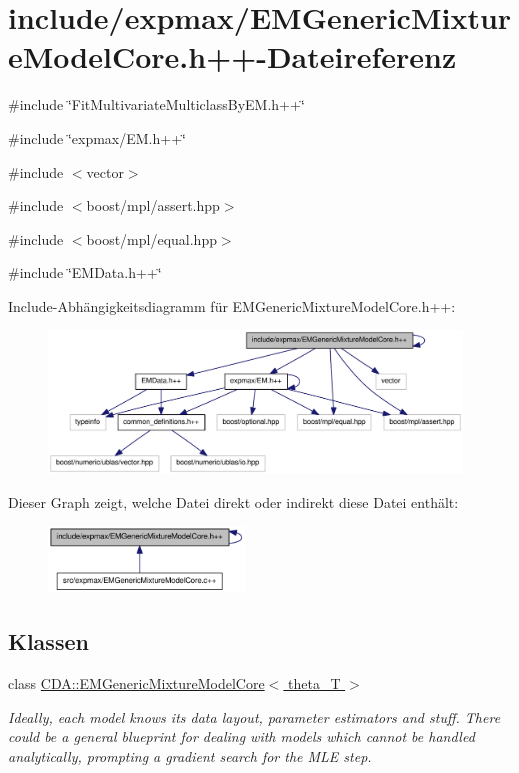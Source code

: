 \hypertarget{EMGenericMixtureModelCore_8h_09_09}{
\section{include/expmax/EMGenericMixtureModelCore.h++-\/Dateireferenz}
\label{EMGenericMixtureModelCore_8h_09_09}
}
{\ttfamily \#include \char`\"{}FitMultivariateMulticlassByEM.h++\char`\"{}}\par
{\ttfamily \#include \char`\"{}expmax/EM.h++\char`\"{}}\par
{\ttfamily \#include $<$vector$>$}\par
{\ttfamily \#include $<$boost/mpl/assert.hpp$>$}\par
{\ttfamily \#include $<$boost/mpl/equal.hpp$>$}\par
{\ttfamily \#include \char`\"{}EMData.h++\char`\"{}}\par
Include-\/Abhängigkeitsdiagramm für EMGenericMixtureModelCore.h++:\nopagebreak
\begin{figure}[H]
\begin{center}
\leavevmode
\includegraphics[width=311pt]{EMGenericMixtureModelCore_8h_09_09__incl}
\end{center}
\end{figure}
Dieser Graph zeigt, welche Datei direkt oder indirekt diese Datei enthält:\nopagebreak
\begin{figure}[H]
\begin{center}
\leavevmode
\includegraphics[width=148pt]{EMGenericMixtureModelCore_8h_09_09__dep__incl}
\end{center}
\end{figure}
\subsection*{Klassen}
\begin{DoxyCompactItemize}
\item 
class \hyperlink{classCDA_1_1EMGenericMixtureModelCore}{CDA::EMGenericMixtureModelCore$<$ theta\_\-T $>$}
\begin{DoxyCompactList}\small\item\em Ideally, each model knows its data layout, parameter estimators and stuff. There could be a general blueprint for dealing with models which cannot be handled analytically, prompting a gradient search for the MLE step. \item\end{DoxyCompactList}\end{DoxyCompactItemize}


